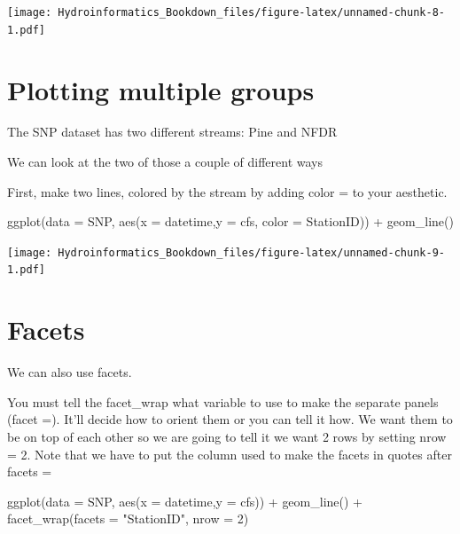 \documentclass[
]{book}
\newenvironment{Shaded}{\begin{snugshade}}{\end{snugshade}}
\newcommand{\AttributeTok}[1]{\textcolor[rgb]{0.77,0.63,0.00}{#1}}
\newcommand{\DecValTok}[1]{\textcolor[rgb]{0.00,0.00,0.81}{#1}}
\newcommand{\FunctionTok}[1]{\textcolor[rgb]{0.00,0.00,0.00}{#1}}
\newcommand{\NormalTok}[1]{#1}
\newcommand{\SpecialCharTok}[1]{\textcolor[rgb]{0.00,0.00,0.00}{#1}}
\newcommand{\StringTok}[1]{\textcolor[rgb]{0.31,0.60,0.02}{#1}}
\begin{document}
\texttt{[image: Hydroinformatics\_Bookdown\_files/figure-latex/unnamed-chunk-8-1.pdf]}

\hypertarget{plotting-multiple-groups}{%
\section{Plotting multiple groups}\label{plotting-multiple-groups}}

The SNP dataset has two different streams: Pine and NFDR

We can look at the two of those a couple of different ways

First, make two lines, colored by the stream by adding color = to your aesthetic.

\begin{Shaded}
\begin{Highlighting}[]
\FunctionTok{ggplot}\NormalTok{(}\AttributeTok{data =}\NormalTok{ SNP, }\FunctionTok{aes}\NormalTok{(}\AttributeTok{x =}\NormalTok{ datetime,}\AttributeTok{y =}\NormalTok{ cfs, }\AttributeTok{color =}\NormalTok{ StationID)) }\SpecialCharTok{+}
  \FunctionTok{geom\_line}\NormalTok{()}
\end{Highlighting}
\end{Shaded}

\texttt{[image: Hydroinformatics\_Bookdown\_files/figure-latex/unnamed-chunk-9-1.pdf]}

\hypertarget{facets}{%
\section{Facets}\label{facets}}

We can also use facets.

You must tell the facet\_wrap what variable to use to make the separate panels (facet =). It'll decide how to orient them or you can tell it how. We want them to be on top of each other so we are going to tell it we want 2 rows by setting nrow = 2. Note that we have to put the column used to make the facets in quotes after facets =

\begin{Shaded}
\begin{Highlighting}[]
\FunctionTok{ggplot}\NormalTok{(}\AttributeTok{data =}\NormalTok{ SNP, }\FunctionTok{aes}\NormalTok{(}\AttributeTok{x =}\NormalTok{ datetime,}\AttributeTok{y =}\NormalTok{ cfs)) }\SpecialCharTok{+}
  \FunctionTok{geom\_line}\NormalTok{() }\SpecialCharTok{+}
  \FunctionTok{facet\_wrap}\NormalTok{(}\AttributeTok{facets =} \StringTok{"StationID"}\NormalTok{, }\AttributeTok{nrow =} \DecValTok{2}\NormalTok{)}
\end{Highlighting}
\end{Shaded}
\end{document}
